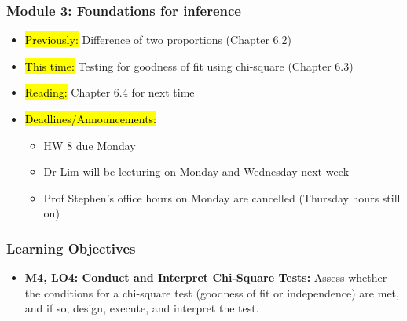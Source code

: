 
\begin{frame}
    \frametitle{Module 3: Foundations for inference}
    \begin{itemize}
        \item \hl{Previously: }Difference of two proportions (Chapter 6.2)
        \item \hl{This time: }Testing for goodness of fit using chi-square (Chapter 6.3)
        \item \hl{Reading: }Chapter 6.4 for next time
        \item \hl{Deadlines/Announcements: } 
        \begin{itemize}
            \item HW 8 due Monday
            \item Dr Lim will be lecturing on Monday and Wednesday next week
            \item Prof Stephen's office hours on Monday are cancelled (Thursday hours still on)
        \end{itemize}
    \end{itemize}
    
\end{frame}

\begin{frame}
    \frametitle{Learning Objectives}
    \begin{itemize}
        \item \textbf{M4, LO4: Conduct and Interpret Chi-Square Tests:} Assess whether the conditions for a chi-square test (goodness of fit or independence) are met, and if so, design, execute, and interpret the test.
    \end{itemize}
\end{frame}
